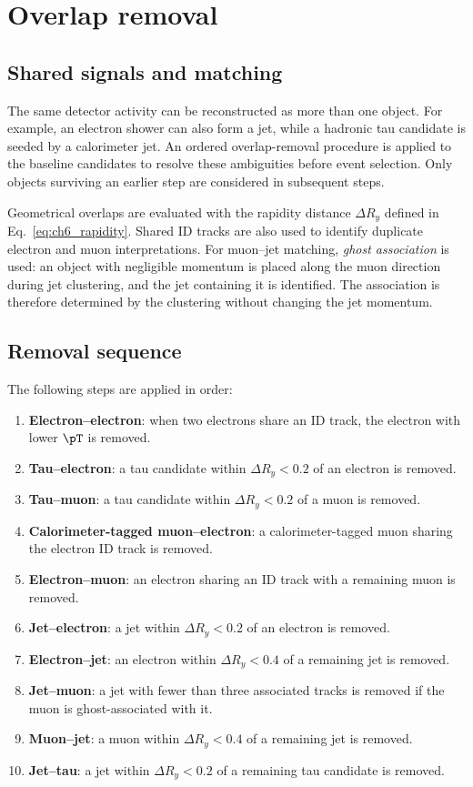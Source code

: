 \section{Overlap removal}
\label{sec:ch6_overlap}

\subsection{Shared signals and matching}

The same detector activity can be reconstructed as more than one object.
For example, an electron shower can also form a jet, while a hadronic tau candidate is seeded by a calorimeter jet.
An ordered overlap-removal procedure is applied to the baseline candidates to resolve these ambiguities before event selection.
Only objects surviving an earlier step are considered in subsequent steps.

Geometrical overlaps are evaluated with the rapidity distance $\Delta R_y$ defined in Eq.~\eqref{eq:ch6_rapidity}.
Shared ID tracks are also used to identify duplicate electron and muon interpretations.
For muon--jet matching, \emph{ghost association} is used: an object with negligible momentum is placed along the muon direction during jet clustering, and the jet containing it is identified.
The association is therefore determined by the clustering without changing the jet momentum.

\subsection{Removal sequence}

The following steps are applied in order:
\begin{enumerate}
    \item \textbf{Electron--electron}: when two electrons share an ID track, the electron with lower $\pT$ is removed.
    \item \textbf{Tau--electron}: a tau candidate within $\Delta R_y<0.2$ of an electron is removed.
    \item \textbf{Tau--muon}: a tau candidate within $\Delta R_y<0.2$ of a muon is removed.
    \item \textbf{Calorimeter-tagged muon--electron}: a calorimeter-tagged muon sharing the electron ID track is removed.
    \item \textbf{Electron--muon}: an electron sharing an ID track with a remaining muon is removed.
    \item \textbf{Jet--electron}: a jet within $\Delta R_y<0.2$ of an electron is removed.
    \item \textbf{Electron--jet}: an electron within $\Delta R_y<0.4$ of a remaining jet is removed.
    \item \textbf{Jet--muon}: a jet with fewer than three associated tracks is removed if the muon is ghost-associated with it.
    \item \textbf{Muon--jet}: a muon within $\Delta R_y<0.4$ of a remaining jet is removed.
    \item \textbf{Jet--tau}: a jet within $\Delta R_y<0.2$ of a remaining tau candidate is removed.
\end{enumerate}


